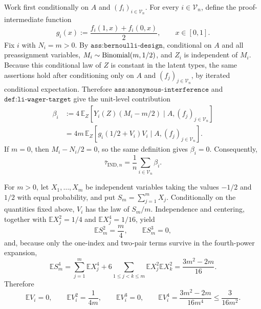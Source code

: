 Work first conditionally on \(A\) and \((f_i)_{i\in\mathcal V_n}\).  For every \(i\in\mathcal V_n\), define the proof-intermediate function
\[
g_i(x):=\frac{f_i(1,x)+f_i(0,x)}{2},\qquad x\in[0,1].
\]
Fix \(i\) with \(N_i=m>0\).  By \(\texttt{ass:bernoulli-design}\), conditional on \(A\) and all preassignment variables, \(M_i\sim {\rm Binomial}(m,1/2)\), and \(Z_i\) is independent of \(M_i\).  Because this conditional law of \(Z\) is constant in the latent types, the same assertions hold after conditioning only on \(A\) and \((f_j)_{j\in\mathcal V_n}\), by iterated conditional expectation.  Therefore \(\texttt{ass:anonymous-interference}\) and \(\texttt{def:li-wager-target}\) give the unit-level contribution
\[
\begin{aligned}
\beta_i
&:=4\,\mathbb E_Z\!\left[Y_i(Z)(M_i-m/2)\mid A,(f_j)_{j\in\mathcal V_n}\right]\\
&=4m\,\mathbb E_Z\!\left[g_i(1/2+V_i)V_i\mid A,(f_j)_{j\in\mathcal V_n}\right].
\end{aligned}
\]
If \(m=0\), then \(M_i-N_i/2=0\), so the same definition gives \(\beta_i=0\).  Consequently,
\[
\bar\tau_{\mathrm{IND},n}=\frac1n\sum_{i\in\mathcal V_n}\beta_i.
\]

For \(m>0\), let \(X_1,\ldots,X_m\) be independent variables taking the values \(-1/2\) and \(1/2\) with equal probability, and put \(S_m=\sum_{j=1}^mX_j\).  Conditionally on the quantities fixed above, \(V_i\) has the law of \(S_m/m\).  Independence and centering, together with \(\mathbb E X_j^2=1/4\) and \(\mathbb E X_j^4=1/16\), yield
\[
\mathbb E S_m^2=\frac m4,
\qquad
\mathbb E S_m^3=0,
\]
and, because only the one-index and two-pair terms survive in the fourth-power expansion,
\[
\mathbb E S_m^4
=\sum_{j=1}^m\mathbb E X_j^4
+6\sum_{1\le j<k\le m}\mathbb E X_j^2\mathbb E X_k^2
=\frac{3m^2-2m}{16}.
\]
Therefore
\[
\mathbb E V_i=0,
\qquad
\mathbb E V_i^2=\frac1{4m},
\qquad
\mathbb E V_i^3=0,
\qquad
\mathbb E V_i^4=\frac{3m^2-2m}{16m^4}\le\frac3{16m^2}.
\]

